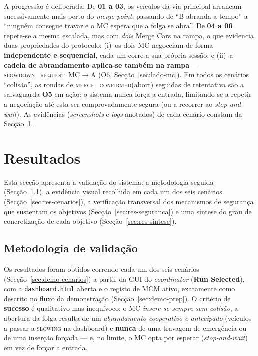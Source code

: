 \documentclass[11pt,a4paper]{article}
\begin{document}
A progressão é deliberada. De \textbf{01 a 03}, os veículos da via principal arrancam
sucessivamente mais perto do \emph{merge point}, passando de ``B abranda a tempo'' a
``ninguém consegue travar e o MC espera que a folga se abra''. De \textbf{04 a 06}
repete-se a mesma escalada, mas com \emph{dois} Merge Cars na rampa, o que evidencia
duas propriedades do protocolo: (i)~os dois MC negoceiam de forma
\textbf{independente e sequencial}, cada um corre a sua própria sessão; e (ii)~a
\textbf{cadeia de abrandamento aplica-se também na rampa} ---
\textsc{slowdown\_request}~MC$\rightarrow$A (O6, Secção~\ref{sec:lado-mc}). Em todos os
cenários ``colisão'', as rondas de \textsc{merge\_confirmed}(abort) seguidas de
retentativa são a salvaguarda \textbf{O5} em ação: o sistema nunca força a entrada,
limitando-se a repetir a negociação até esta ser comprovadamente segura (ou a recorrer
ao \emph{stop-and-wait}). As evidências (\emph{screenshots} e \emph{logs} anotados) de
cada cenário constam da Secção~\ref{sec:resultados}.

\section{Resultados}
\label{sec:resultados}

Esta secção apresenta a validação do sistema: a metodologia seguida
(Secção~\ref{sec:res-metodo}), a evidência visual recolhida em cada um dos seis
cenários (Secção~\ref{sec:res-cenarios}), a verificação transversal dos mecanismos de
segurança que sustentam os objetivos (Secção~\ref{sec:res-seguranca}) e uma síntese do
grau de concretização de cada objetivo (Secção~\ref{sec:res-sintese}).

\subsection{Metodologia de validação}
\label{sec:res-metodo}

Os resultados foram obtidos correndo cada um dos seis cenários
(Secção~\ref{sec:demo-cenarios}) a partir da GUI do \emph{coordinator}
(\textbf{Run Selected}), com a \texttt{dashboard.html} aberta e o registo de MCM
ativo, exatamente como descrito no fluxo da demonstração
(Secção~\ref{sec:demo-prep}). O critério de \textbf{sucesso} é qualitativo mas
inequívoco: o MC \emph{insere-se sempre sem colisão}, a abertura da folga resulta de um
\emph{abrandamento cooperativo e antecipado} (veículos a passar a \textsc{slowing} na
dashboard) e \textbf{nunca} de uma travagem de emergência ou de uma inserção forçada ---
e, no limite, o MC opta por esperar (\emph{stop-and-wait}) em vez de forçar a entrada.
\end{document}
